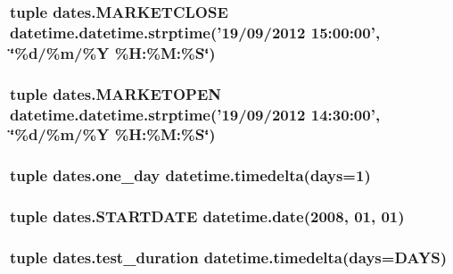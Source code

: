 \hypertarget{namespacedates_a8f24102a16c642a20c044ebe835f8957}{
\subsubsection[{M\-A\-R\-K\-E\-T\-C\-L\-O\-S\-E}]{\setlength{\rightskip}{0pt plus 5cm}tuple dates.\-M\-A\-R\-K\-E\-T\-C\-L\-O\-S\-E datetime.\-datetime.\-strptime('19/09/2012 15\-:00\-:00', \char`\"{}\%d/\%m/\%Y \%H\-:\%M\-:\%S\char`\"{})}}\label{namespacedates_a8f24102a16c642a20c044ebe835f8957}
\hypertarget{namespacedates_a655924a1ad262dcc91ce43132ef0ae58}{
\subsubsection[{M\-A\-R\-K\-E\-T\-O\-P\-E\-N}]{\setlength{\rightskip}{0pt plus 5cm}tuple dates.\-M\-A\-R\-K\-E\-T\-O\-P\-E\-N datetime.\-datetime.\-strptime('19/09/2012 14\-:30\-:00', \char`\"{}\%d/\%m/\%Y \%H\-:\%M\-:\%S\char`\"{})}}\label{namespacedates_a655924a1ad262dcc91ce43132ef0ae58}
\hypertarget{namespacedates_a8d9eade5fcb0146fcd3e5321e21bf680}{
\subsubsection[{one\-\_\-day}]{\setlength{\rightskip}{0pt plus 5cm}tuple dates.\-one\-\_\-day datetime.\-timedelta(days=1)}}\label{namespacedates_a8d9eade5fcb0146fcd3e5321e21bf680}
\hypertarget{namespacedates_ac6489b4c92e3ce7332c95047607c9802}{
\subsubsection[{S\-T\-A\-R\-T\-D\-A\-T\-E}]{\setlength{\rightskip}{0pt plus 5cm}tuple dates.\-S\-T\-A\-R\-T\-D\-A\-T\-E datetime.\-date(2008, 01, 01)}}\label{namespacedates_ac6489b4c92e3ce7332c95047607c9802}
\hypertarget{namespacedates_a8f45c9d96755d9c6b639551cb617a110}{
\subsubsection[{test\-\_\-duration}]{\setlength{\rightskip}{0pt plus 5cm}tuple dates.\-test\-\_\-duration datetime.\-timedelta(days={\bf D\-A\-Y\-S})}}\label{namespacedates_a8f45c9d96755d9c6b639551cb617a110}
